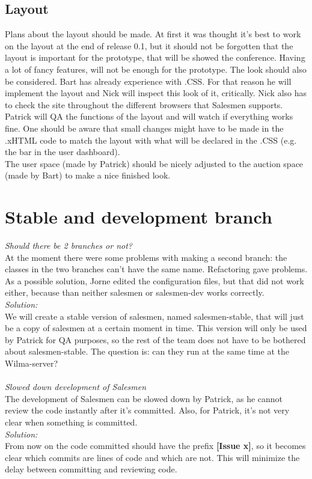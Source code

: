 \documentclass[a4paper, 12pt]{article}
\begin{document}
		\subsection{Layout} 
Plans about the layout should be made. At first it was thought it's best to work on the layout at the end of release 0.1, but it should not be forgotten that the layout is important for the prototype, that will be showed the conference. Having a lot of fancy features, will not be enough for the prototype. The look should also be considered.
Bart has already experience with .CSS. For that reason he will implement the layout and Nick will inspect this look of it, critically. Nick also has to check the site throughout the different browsers that Salesmen supports. Patrick will QA the functions of the layout and will watch if everything works fine.
One should be aware that small changes might have to be made in the .xHTML code to match the layout with what will be declared in the .CSS (e.g. the bar in the user dashboard).\\
The user space (made by Patrick) should be nicely adjusted to the auction space (made by Bart) to make a nice finished look.

	\section{Stable and development branch}
		\textit{Should there be 2 branches or not?}\\
At the moment there were some problems with making a second branch: the classes in the two branches can't have the same name. Refactoring gave problems. As a possible solution, Jorne edited the configuration files, but that did not work either, because than neither salesmen or salesmen-dev works correctly.\\
		\textit{Solution:}\\
We will create a stable version of salesmen, named salesmen-stable, that will just be a copy of salesmen at a certain moment in time. This version will only be used by Patrick for QA purposes, so the rest of the team does not have to be bothered about salesmen-stable. The question is: can they run at the same time at the Wilma-server?\\ \\
		\textit{Slowed down development of Salesmen}\\
The development of Salesmen can be slowed down by Patrick, as he cannot review the code instantly after it's committed. Also, for Patrick, it's not very clear when something is committed. \\
		\textit{Solution:}\\
From now on the code committed should have the prefix \textbf{[Issue x]}, so it becomes clear which commits are lines of code and which are not. This will minimize the delay between committing and reviewing code.
\end{document}

